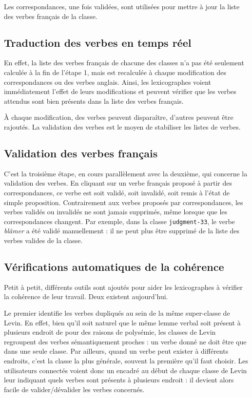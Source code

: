 Les correspondances, une fois validées, sont utilisées pour mettre à jour la
liste des verbes français de la classe.

\subsection{Traduction des verbes en temps réel}

En effet, la liste des verbes français de chacune des classes n'a pas été
seulement calculée à la fin de l'étape 1, mais est recalculée à chaque
modification des correspondances ou des verbes anglais. Ainsi, les
lexicographes voient immédiatement l'effet de leurs modifications et peuvent
vérifier que les verbes attendus sont bien présents dans la liste des verbes
français.

À chaque modification, des verbes peuvent disparaître, d'autres peuvent être
rajoutés. La validation des verbes est le moyen de stabiliser les listes de
verbes.

\subsection{Validation des verbes français}

C'est la troisième étape, en cours parallèlement avec la deuxième, qui concerne
la validation des verbes. En cliquant sur un verbe français proposé à partir
des correspondances, ce verbe est soit validé, soit invalidé, soit remis à
l'état de simple proposition. Contrairement aux verbes proposés par
correspondances, les verbes validés ou invalidés ne sont jamais supprimés, même
lorsque que les correspondances changent. Par exemple, dans la classe
\texttt{judgment-33}, le verbe \emph{blâmer} a été validé manuellement : il ne
peut plus être supprimé de la liste des verbes valides de la classe.

\subsection{Vérifications automatiques de la cohérence}

Petit à petit, différents outils sont ajoutés pour aider les lexicographes à
vérifier la cohérence de leur travail. Deux existent aujourd'hui.

Le premier identifie les verbes dupliqués au sein de la même super-classe de
Levin. En effet, bien qu'il soit naturel que le même lemme verbal soit présent
à plusieurs endroit de \verbenet{} pour des raisons de polysémie, les classes
de Levin regroupent des verbes sémantiquement proches : un verbe donné ne doit
être que dans une seule classe. Par ailleurs, quand un verbe peut exister à
différents endroits, c'est la classe la plus générale, souvent la première
qu'il faut choisir. Les utilisateurs connectés voient donc un encadré au début
de chaque classe de Levin leur indiquant quels verbes sont présents à plusieurs
endroit : il devient alors facile de valider/dévalider les verbes concernés.

